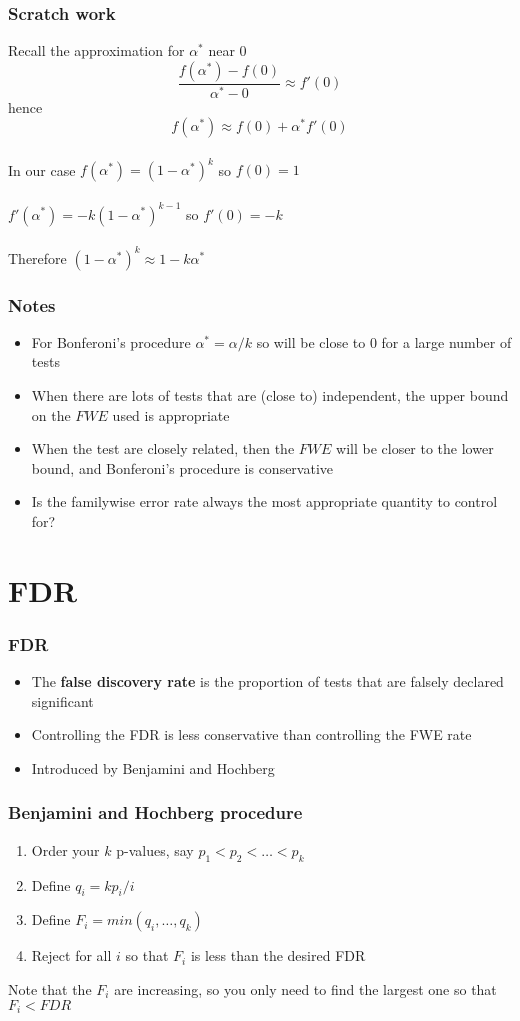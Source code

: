 \documentclass[aspectratio=169]{beamer}
\begin{document}
\begin{frame}\frametitle{Scratch work} 
Recall the approximation for $\alpha^*$ near 0
$$
\frac{f(\alpha^*) - f(0)}{\alpha^* - 0} \approx f'(0) 
$$
hence
$$
f(\alpha^*) \approx f(0) + \alpha^* f'(0)
$$ \\
In our case $f(\alpha^*) = (1 - \alpha^*)^k$ so $f(0) = 1$ \ \\ \ \\
$f'(\alpha^*) = -k(1 - \alpha^*)^{k-1}$ so $f'(0) = -k$
\ \\ \ \\
Therefore $(1 - \alpha^*)^k \approx 1 - k \alpha^*$
\end{frame}

\begin{frame}\frametitle{Notes}
\begin{itemize}
\item For Bonferoni's procedure $\alpha^* = \alpha / k$ so will be close to 0 for 
  a large number of tests
\item When there are lots of tests that are (close to) independent, 
  the upper bound on the $FWE$ used is appropriate
\item When the test are closely related, then the $FWE$ will be closer to the lower
  bound, and Bonferoni's procedure is conservative
\item Is the familywise error rate always the most appropriate quantity to control for?
\end{itemize}
\end{frame}

\section{FDR}
\begin{frame}\frametitle{FDR}
\begin{itemize}
\item The {\bf false discovery rate} is the proportion of tests that are
  falsely declared significant
\item Controlling the FDR is less conservative than controlling the FWE rate
\item Introduced by Benjamini and Hochberg
\end{itemize}
\end{frame}


\begin{frame}\frametitle{Benjamini and Hochberg procedure}
\begin{enumerate}
\item Order your $k$ p-values, say $p_1 < p_2 < \ldots <p_k$
\item Define $q_i = k p_i / i$
\item Define $F_i = min(q_i,\ldots,q_k)$
\item Reject for all $i$ so that $F_i$ is less than the desired FDR
\end{enumerate}
Note that the $F_i$ are increasing, so you only need to find the largest
one so that $F_i < FDR$
\end{frame} 
\end{document}
